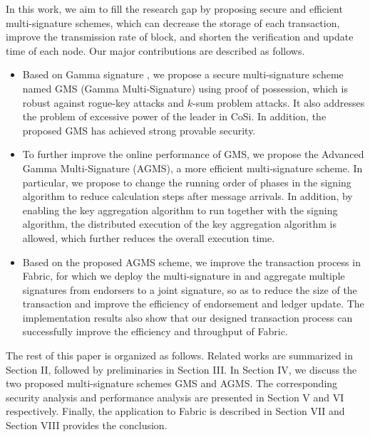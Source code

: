 \documentclass[journal]{IEEEtran}
\begin{document}
In this work, we aim to fill the research gap by proposing secure and efficient multi-signature schemes, which can decrease the storage of each transaction, improve the transmission rate of block, and shorten the verification and update time of each node. Our major contributions are described as follows.

\begin{itemize}
    \item Based on Gamma signature \cite{01DBLP:journals/tifs/YaoZ13}, we propose a secure multi-signature scheme named GMS (Gamma Multi-Signature) using proof of possession, which is robust against rogue-key attacks and \(k\)-sum problem attacks. It also addresses the problem of excessive power of the leader in CoSi. In addition, the proposed GMS has achieved strong provable security.

    \item To further improve the online performance of GMS, we propose the Advanced Gamma Multi-Signature (AGMS), a more efficient multi-signature scheme. In particular, we propose to change the running order of phases in the signing algorithm to reduce calculation steps after message arrivals. In addition, by enabling the key aggregation algorithm to run together with the signing algorithm, the distributed execution of the key aggregation algorithm is allowed, which further reduces the overall execution time.

    \item Based on the proposed AGMS scheme, we improve the transaction process in Fabric, for which we deploy the multi-signature in and aggregate multiple signatures from endorsers to a joint signature, so as to reduce the size of the transaction and improve the efficiency of endorsement and ledger update. The implementation results also show that our designed transaction process can successfully improve the efficiency and throughput of Fabric.
\end{itemize}

The rest of this paper is organized as follows. Related works are summarized in Section II, followed by preliminaries in Section III. In Section IV, we discuss the two proposed multi-signature schemes GMS and AGMS. The corresponding security analysis and performance analysis are presented in Section V and VI respectively. Finally, the application to Fabric is described in Section VII and Section VIII provides the conclusion.
\end{document}
